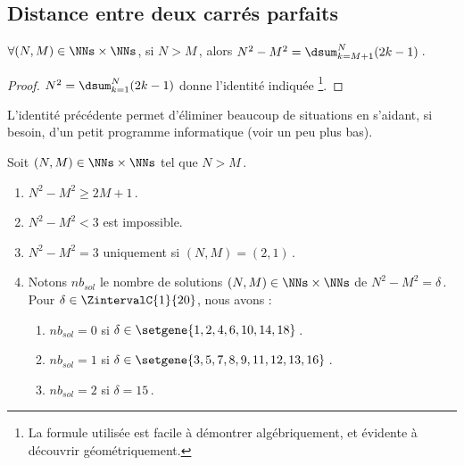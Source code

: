 \subsection{Distance entre deux carrés parfaits}

	
\begin{fact} \label{dist-square}
	$\forall (N, M) \in \NNs \times \NNs$, 
	si $N > M$\,, alors $N^2 - M^2 = \dsum_{k=M+1}^{N} (2 k - 1)$\,.
\end{fact}


\begin{proof}
	$N^2 = \dsum_{k=1}^{N} (2 k - 1)$ donne l'identité indiquée
	\footnote{
		La formule utilisée est facile à démontrer algébriquement, et évidente à découvrir géométriquement.
	}.
\end{proof}




L'identité précédente permet d'éliminer beaucoup de situations en s'aidant, si besoin, d'un petit programme informatique (voir un peu plus bas).

\begin{fact} \label{diff-square-ko}
	Soit $(N, M) \in \NNs \times \NNs$ tel que $N > M$\,.
	\begin{enumerate}
		\item $N^2 - M^2 \geq 2M + 1$\,.
		
		\item $N^2 - M^2 < 3$ est impossible.
		
		\item $N^2 - M^2 = 3$ uniquement si $(N, M) = (2, 1)$\,.
		
		\item Notons $nb_{sol}$ le nombre de solutions $(N, M) \in \NNs \times \NNs$ de $N^2 - M^2 = \delta$\,.
		Pour $\delta \in \ZintervalC{1}{20}$, nous avons :
		\begin{enumerate}
			\item $nb_{sol}= 0$ si $\delta \in \setgene{1, 2, 4, 6, 10, 14, 18}$\,.

			\item $nb_{sol}= 1$ si $\delta \in \setgene{3, 5, 7, 8, 9, 11, 12, 13, 16}$\,.

			\item $nb_{sol}= 2$ si $\delta = 15$\,.
		\end{enumerate}
	\end{enumerate}
\end{fact}


